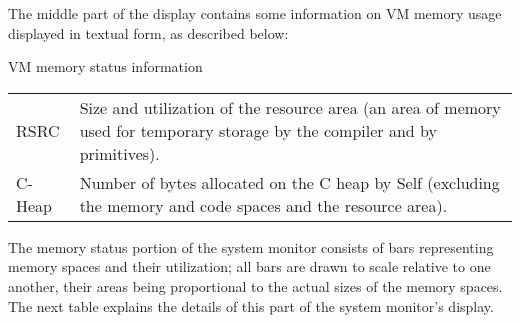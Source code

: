 \documentclass[letterpaper,10pt,english]{sphinxmanual}
\begin{document}
The middle part of the display contains some information on VM memory usage displayed in textual
form, as described below:


\begin{threeparttable}
\capstart\caption{VM memory status information}\label{\detokenize{monitor:id2}}
\noindent\begin{tabulary}{\linewidth}{p{5cm} p{10cm}}
\hline
{}\relax &\relax \\
\hline
RSRC
&
Size and utilization of the resource area (an area of memory used for temporary storage by the
compiler and by primitives).
\\
\hline
C-Heap
&
Number of bytes allocated on the C heap by Self (excluding the memory and code spaces and the
resource area).
\\
\hline\end{tabulary}

\end{threeparttable}


The memory status portion of the system monitor consists of bars representing memory spaces and
their utilization; all bars are drawn to scale relative to one another, their areas being proportional
to the actual sizes of the memory spaces. The next table explains the details of this part of the system
monitor’s display.
\end{document}
